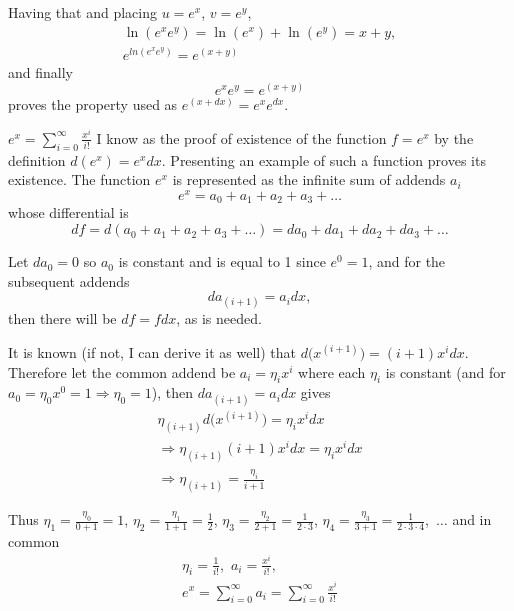 \documentclass[11pt, twoside]{book}
\begin{document}
Having that and placing $u = e^x$, $v = e^y$,
\begin{gather*}
\operatorname{ln}( e^x e^y ) = \operatorname{ln}(e^x) + \operatorname{ln}(e^y) = x + y,\\
e^{ln( e^x e^y )} = e^{(x + y)}
\end{gather*}
and finally
\begin{equation*}
e^x e^y = e^{(x + y)}
\end{equation*}
proves the property used as $e^{(x+dx)} = e^x e^{dx}$.

$e^x = \sum_{i=0}^{\infty} \frac{x^i}{i!}$ I know as the proof of existence of the function $f = e^x$ by the definition $d(e^x) = e^x dx$.
Presenting an example of such a function proves its existence.
The function $e^x$ is represented as the infinite sum of addends $a_i$
\begin{equation*}
e^x = a_0 + a_1 + a_2 + a_3 + \ldots
\end{equation*}
whose differential is
\begin{equation*}
df = d(a_0 + a_1 + a_2 + a_3 + \ldots)
= da_0 + da_1 + da_2 + da_3 + \ldots
\end{equation*}

Let
$da_0 = 0$ so $a_0$ is constant and is equal to 1 since $e^0 = 1$, and for the subsequent addends
\begin{equation*}
da_{(i+1)} = a_i dx,
\end{equation*}
then there will be $df = fdx$, as is needed.

It is known (if not, I can derive it as well) that $d\bigl( x^{(i+1)} \bigr) = (i+1) x^i dx$. Therefore let the common addend be $a_i = \eta_i x^i$ where each $\eta_i$ is constant
(and for $a_0 = \eta_0 x^0 = 1 \Rightarrow \eta_0 = 1$),
then $da_{(i+1)} = a_i dx$ gives
\begin{gather*}
\eta_{(i+1)} d\bigl( x^{(i+1)} \bigr) = \eta_i x^i dx \\
\Rightarrow \eta_{(i+1)} (i+1) x^i dx = \eta_i x^i dx \\
\Rightarrow \eta_{(i+1)} = \frac{\eta_i}{i+1}
\end{gather*}

Thus
$\eta_1 = \frac{\eta_0}{0+1} = 1$,
$\eta_2 = \frac{\eta_1}{1+1} = \frac{1}{2}$,
$\eta_3 = \frac{\eta_2}{2+1} = \frac{1}{2 \cdot 3}$, $\eta_4 = \frac{\eta_3}{3+1} = \frac{1}{2 \cdot 3 \cdot 4}$, $\,\ldots$ and in common
\begin{gather*}
\eta_i = \frac{1}{i!}, \,\, a_i = \frac{x^i}{i!},\\
e^x = \sum_{i=0}^{\infty} a_i = \sum_{i=0}^{\infty} \frac{x^i}{i!}
\end{gather*}
\end{document}

